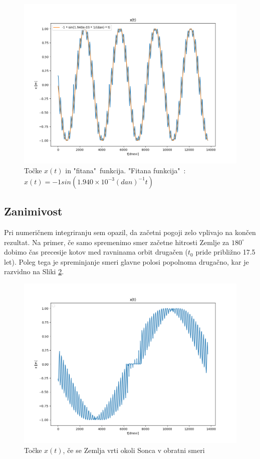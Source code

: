 \documentclass[titlepage,12pt,a4paper]{article}
\begin{document}
\begin{figure}[H]
\begin{center}
	\includegraphics[scale=0.6]{Slike/smer_glavne_polosi_fitted}
	\caption{Točke $x(t)$ in "fitana"\ funkcija. "Fitana funkcija"\ : $x(t) = -1sin(1.940\times 10^{-3}(dan)^{-1}t)$}
	\label{smer polosi fittano}
\end{center}
\end{figure}

\subsection{Zanimivost}
Pri numeričnem integriranju sem opazil, da začetni pogoji zelo vplivajo na končen rezultat. Na primer, če samo spremenimo smer začetne hitrosti Zemlje za $180^{\circ}$ dobimo čas precesije kotov med ravninama orbit drugačen ($t_0$ pride približno 17.5 let). Poleg tega je spreminjanje smeri glavne polosi popolnoma drugačno, kar je razvidno na Sliki \ref{smer polosi obratna smer}.

\begin{figure}[H]
\begin{center}
	\includegraphics[scale=0.6]{Slike/obratna_smer_x_t}
	\caption{Točke $x(t)$, če se Zemlja vrti okoli Sonca v obratni smeri}
	\label{smer polosi obratna smer}
\end{center}
\end{figure}
\end{document}
